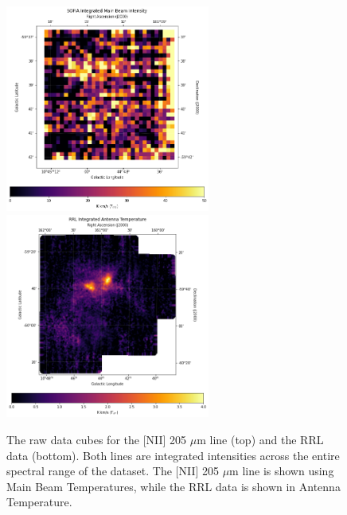 
\begin{figure}[t!]
    \centering
    \includegraphics[width=0.6\textwidth]{figs/carina/raw_NII.png}
    \includegraphics[width=0.6\textwidth]{figs/carina/raw_RRL.png}
    \caption[Raw Data Cubes for {[}NII{]} and RRLs in Carina Nebula]{
        The raw data cubes for the [NII] 205 $\mu$m line (top) and the RRL data (bottom). 
        Both lines are integrated intensities across the entire spectral range of the dataset.
        The [NII] 205 $\mu$m line is shown using Main Beam Temperatures, while the RRL data is shown in Antenna Temperature.
        }
    \label{carina/fig:raw_data}
\end{figure}

